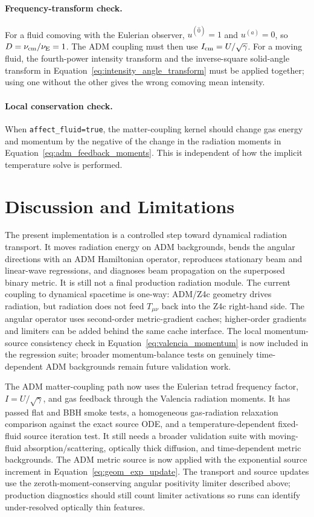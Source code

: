 \documentclass[11pt]{article}
\newcommand{\nuE}{\nu_{\rm E}}
\newcommand{\nucm}{\nu_{\rm cm}}
\newcommand{\code}[1]{\texttt{#1}}
\begin{document}
\paragraph{Frequency-transform check.}
For a fluid comoving with the Eulerian observer,
\(u^{(\hat0)}=1\) and \(u^{(\hat a)}=0\), so
\(D=\nucm/\nuE=1\).  The ADM coupling must then use
\(I_{\rm cm}=U/\sqrt{\gamma}\).  For a moving fluid, the fourth-power intensity
transform and the inverse-square solid-angle transform in
Equation~\eqref{eq:intensity_angle_transform} must be applied together; using
one without the other gives the wrong comoving mean intensity.

\paragraph{Local conservation check.}
When \code{affect\_fluid=true}, the matter-coupling kernel should change gas
energy and momentum by the negative of the change in the radiation moments in
Equation~\eqref{eq:adm_feedback_moments}.  This is independent of how the
implicit temperature solve is performed.

\section{Discussion and Limitations}
\label{sec:discussion}

The present implementation is a controlled step toward dynamical radiation
transport.  It moves radiation energy on ADM backgrounds, bends the angular
directions with an ADM Hamiltonian operator, reproduces stationary beam and
linear-wave regressions, and diagnoses beam propagation on the superposed binary
metric.  It is still not a final production radiation module.  The current
coupling to dynamical spacetime is one-way: ADM/Z4c geometry drives radiation,
but radiation does not feed \(T_{\mu\nu}\) back into the Z4c right-hand side.
The angular
operator uses second-order metric-gradient caches; higher-order gradients and
limiters can be added behind the same cache interface.  The local
momentum-source consistency check in Equation~\eqref{eq:valencia_momentum} is
now included in the regression suite; broader momentum-balance tests on
genuinely time-dependent ADM backgrounds remain future validation work.

The ADM matter-coupling path now uses the Eulerian tetrad frequency factor,
\(I=U/\sqrt{\gamma}\), and gas feedback through the Valencia radiation moments.
It has passed flat and BBH smoke tests, a homogeneous gas-radiation relaxation
comparison against the exact source ODE, and a temperature-dependent
fixed-fluid source iteration test.  It still needs a broader validation suite
with moving-fluid absorption/scattering, optically thick diffusion, and
time-dependent metric backgrounds.  The ADM metric source is now applied with
the exponential source increment in Equation~\eqref{eq:geom_exp_update}.  The
transport and source updates use the zeroth-moment-conserving angular
positivity limiter described above; production diagnostics should still count
limiter activations so runs can identify under-resolved optically thin
features.
\end{document}
